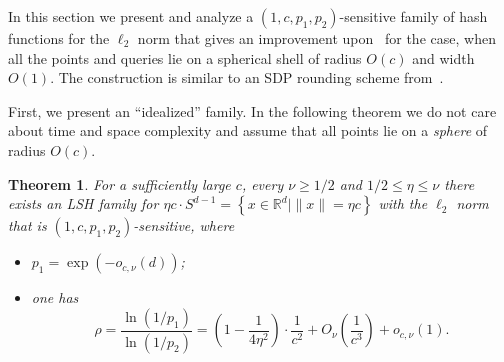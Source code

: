 \documentclass[11pt,letterpaper]{article}
\newtheorem{theorem}{Theorem}
\newcommand{\set}[1]{\left\{#1\right\}}
\newcommand{\Rbb}{\mathbb{R}}
\begin{document}
\label{gaussian_section}

In this section we present and analyze a $(1, c, p_1, p_2)$-sensitive family of hash functions for the $\ell_2$ norm
that gives an improvement upon~\cite{ai-nohaa-06} for the case, when
all the points and queries lie on a spherical shell of radius $O(c)$ and width $O(1)$.
The construction is similar to an SDP rounding scheme
from~\cite{kms-agcsp-98}.

First, we present an ``idealized'' family. In the following theorem we do not care about time and space complexity
and assume that all points lie on a \emph{sphere} of radius $O(c)$.

\begin{theorem}
    \label{gaussian_lsh}
    For a sufficiently large $c$, every $\nu \geq 1/2$ and $1/2 \leq \eta \leq \nu$
    there exists an LSH family for
    $\eta c \cdot S^{d-1} = \set{x \in \Rbb^d \mid \|x\| = \eta c}$ with the $\ell_2$ norm
    that is $(1, c, p_1, p_2)$-sensitive, where
    \begin{itemize}
        \item $p_1 = \exp(-o_{c,\nu}(d))$;
        \item one has
            $$
                \rho = \frac{\ln(1 / p_1)}{\ln(1 / p_2)} = \left(1 - \frac{1}{4 \eta^2}\right) \cdot \frac{1}{c^2} +
                O_{\nu}\left(\frac{1}{c^3}\right) + o_{c, \nu}(1).
            $$
    \end{itemize}
\end{theorem}
\end{document}
